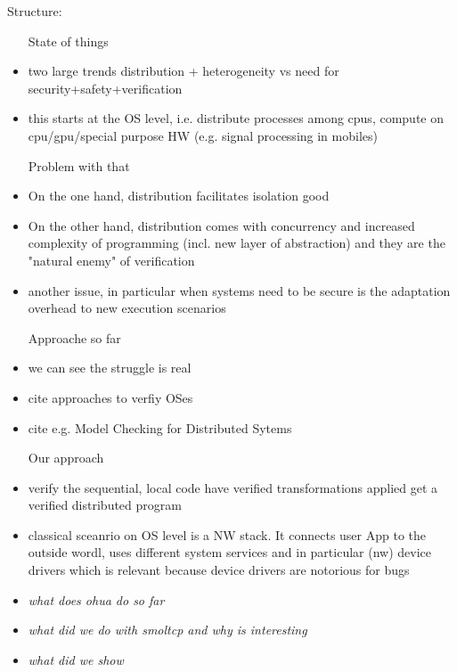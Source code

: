 Structure:
\begin{itemize}
    \item[State of things]
    \item two large trends \means distribution + heterogeneity vs need for security+safety+verification 
    \item this starts at the OS level, i.e. distribute processes among cpus, compute on cpu/gpu/special purpose HW (e.g. signal processing in mobiles)
    \item[Problem with that]
    \item On the one hand, distribution facilitates isolation \means good
    \item On the other hand, distribution comes with concurrency and increased complexity of programming (incl. new layer of abstraction) and they are the "natural enemy" of verification
    \item another issue, in particular when systems need to be secure is the adaptation overhead to new execution scenarios
    \item[Approache so far]
    \item we can see the struggle is real 
    \item cite approaches to verfiy OSes
    \item cite e.g. Model Checking for Distributed Sytems 
    \item[Our approach]
    \item verify the sequential, local code \means have verified transformations applied \means get a verified distributed program
    \item classical sceanrio on OS level is a NW stack. It connects user App to the outside wordl, uses different system services and in particular (nw) device drivers which is relevant because device drivers are notorious for bugs
    \item \emph{what does ohua do so far}
    \item \emph{what did we do with smoltcp and why is interesting}
    \item \emph{what did we show}
\end{itemize}


